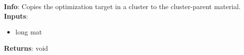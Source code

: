 \textbf{Info}: Copies the optimization target in a cluster to the cluster-parent
material.\\

\noindent \textbf{Inputs}:
\begin{itemize}
\item{long mat}
\end{itemize}

\noindent \textbf{Returns}: void
